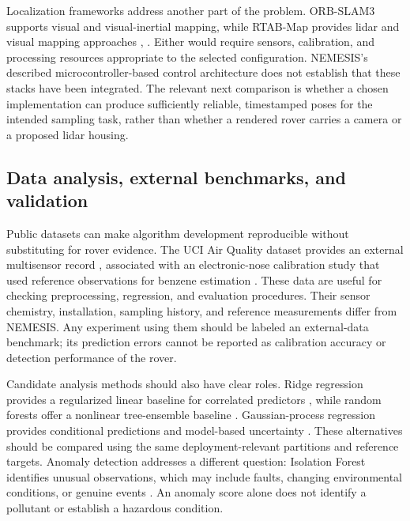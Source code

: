 \documentclass[11pt,a4paper]{article}
\begin{document}
Localization frameworks address another part of the problem. ORB-SLAM3 supports visual and visual-inertial mapping, while RTAB-Map provides lidar and visual mapping approaches \citep{campos2021_973bd6}, \citep{labb2019_d34c3f}. Either would require sensors, calibration, and processing resources appropriate to the selected configuration. NEMESIS’s described microcontroller-based control architecture does not establish that these stacks have been integrated. The relevant next comparison is whether a chosen implementation can produce sufficiently reliable, timestamped poses for the intended sampling task, rather than whether a rendered rover carries a camera or a proposed lidar housing.

\FloatBarrier

\subsection{Data analysis, external benchmarks, and validation}\label{sec:3.7}

Public datasets can make algorithm development reproducible without substituting for rover evidence. The UCI Air Quality dataset provides an external multisensor record \citep{vito2008_026a72}, associated with an electronic-nose calibration study that used reference observations for benzene estimation \citep{devito2008_1548b8}. These data are useful for checking preprocessing, regression, and evaluation procedures. Their sensor chemistry, installation, sampling history, and reference measurements differ from NEMESIS. Any experiment using them should be labeled an external-data benchmark; its prediction errors cannot be reported as calibration accuracy or detection performance of the rover.

Candidate analysis methods should also have clear roles. Ridge regression provides a regularized linear baseline for correlated predictors \citep{hoerl1970_31b919}, while random forests offer a nonlinear tree-ensemble baseline \citep{breiman2001_75dc04}. Gaussian-process regression provides conditional predictions and model-based uncertainty \citep{rasmussen2006_5c445c}. These alternatives should be compared using the same deployment-relevant partitions and reference targets. Anomaly detection addresses a different question: Isolation Forest identifies unusual observations, which may include faults, changing environmental conditions, or genuine events \citep{liu2012_0ef0af}. An anomaly score alone does not identify a pollutant or establish a hazardous condition.
\end{document}
